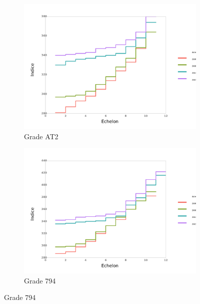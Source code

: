 \documentclass[11pt,a4paper]{article}
\begin{document}
\medskip


\begin{figure}[ht] 
  \caption{Evolution des grilles: grade par grade}
  \label{echelon_by_neg} 
  \begin{subfigure}[b]{0.55\linewidth}
      \caption{Grade AT2} 
    \label{echelon_by_neg_0} 
    \centering
    \includegraphics[width=1\linewidth]{0_grille_by_neg.pdf} 
    \vspace{4ex}
  \end{subfigure}%
  \begin{subfigure}[b]{0.55\linewidth}
        \caption{Grade 794} 
    \label{echelon_by_neg_1} 
    \centering
    \includegraphics[width=1\linewidth]{1_grille_by_neg.pdf} 
    \vspace{4ex}

\end{subfigure}
\end{figure}
\end{document}
